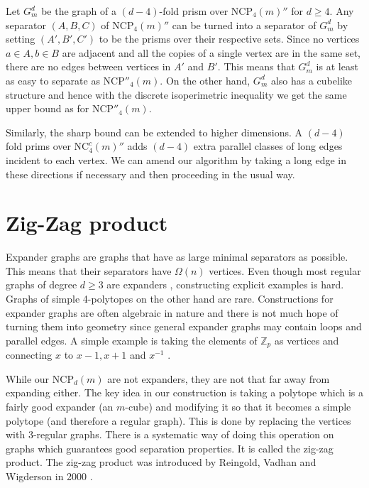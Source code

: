 \documentclass[a4paper,12pt]{book}
\theoremstyle{plain}
\theoremstyle{definition}
\newcommand\NC{\textrm{NCP}}
\newcommand\NCC{\mathrm{NC}^c}
\begin{document}
Let $G^d_m$ be the graph of a $(d-4)$-fold prism over $\NC_4(m)''$ for $d\geq 4$. 
Any separator 
$(A,B,C)$ of $\NC_4(m)''$ can be turned into a separator of $G^d_m$ by setting 
$(A',B',C')$ to be the prisms over their respective sets. Since no vertices 
$a\in A, b\in B$ are adjacent and all the copies of a single vertex are in the 
same set, there are no edges between vertices in $A'$ and $B'$. This means that 
$G^d_m$ is at least as easy to separate as $\NC''_4(m)$. On the other hand, $G^d_m$ 
also has a cubelike structure and hence with the discrete isoperimetric 
inequality we get the same upper bound as for $\NC''_4(m)$. 

Similarly, the sharp bound can be extended to higher dimensions. A $(d-4)$ fold
prims over $\NCC_4(m)''$ adds $(d-4)$ extra parallel classes of long edges incident
to each vertex. We can amend our algorithm by taking a long edge in these directions 
if necessary and then proceeding in the usual way.

\section{Zig-Zag product}

Expander graphs are graphs that have as large minimal separators as possible. This means that their
separators have $\Omega(n)$ vertices.
Even though most regular graphs of degree $d\ge 3$ are expanders \cite{KoBa1967}, 
constructing explicit examples is hard. Graphs of simple 4-polytopes on the other hand
are rare. Constructions for expander graphs are often algebraic in nature and there is not much hope of turning them into
geometry since general expander graphs may contain loops and parallel edges. 
A simple example is taking the elements of $\mathbb{Z}_p$ as vertices and connecting $x$ to $x-1,x+1$ and $x^{-1}$ \cite{Lubo}.

 While our $\NC_d(m)$ are not expanders, they are not that  
far away from expanding either. The key idea in our construction is taking a polytope which
is a fairly good expander (an $m$-cube)
and modifying it so that it becomes a simple polytope (and therefore a regular graph). This
is done by replacing the vertices with 3-regular graphs. There is a systematic way of doing this operation
on graphs which guarantees good separation properties. It is called
the zig-zag product. The zig-zag product was introduced by Reingold, Vadhan and Wigderson in 2000 
\cite{892006}. 
\end{document}
